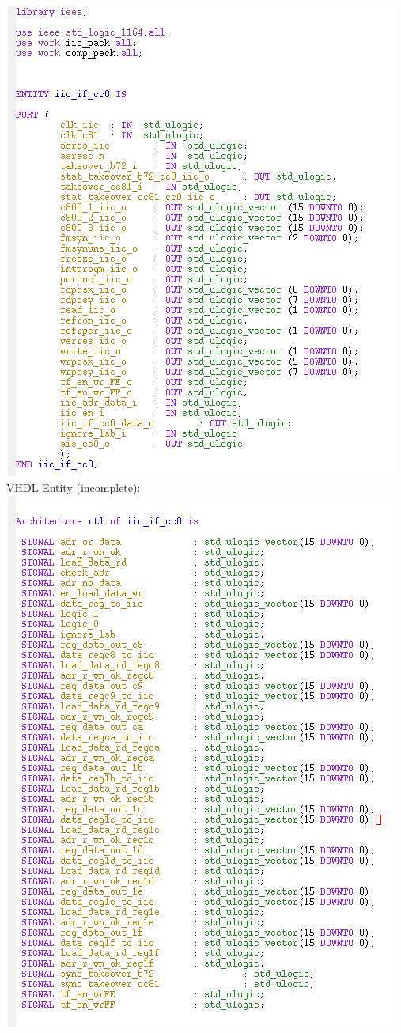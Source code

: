 \documentclass[a4paper,12pt]{report}
\begin{document}
\includegraphics[scale=0.9]{images/FRCA_part_entity.png}\newline
\newpage
VHDL Entity (incomplete):\newline
\includegraphics[scale=0.9]{images/FRCA_part0_arch.png}\newline
\end{document}
